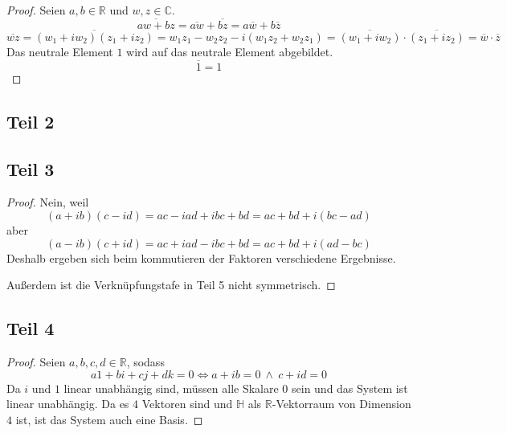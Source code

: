 \documentclass[10pt,a4paper]{article}
\begin{document}
\begin{proof}
Seien $a, b \in \mathbb{R}$ und $w, z \in \mathbb{C}$.
\begin{equation}
\overline{aw + bz} = \overline{aw} + \overline{bz} = a\overline{w} + b\overline{z}
\end{equation}
\begin{equation}
\overline{wz} = \overline{(w_{1} + iw_{2})(z_{1} + iz_{2})} = w_{1}z_{1} - w_{2}z_{2} - i(w_{1}z_{2} + w_{2}z_{1}) = \overline{(w_{1} + iw_{2})} \cdot \overline{(z_{1} + iz_{2})} = \overline{w} \cdot \overline{z}
\end{equation}
Das neutrale Element $1$ wird auf das neutrale Element abgebildet.
\begin{equation}
\overline{1} = 1
\end{equation}
\end{proof}

\subsection*{Teil 2}

\subsection*{Teil 3}

\begin{proof}
Nein, weil
\begin{equation}
(a + ib)(c - id) = ac - iad + ibc + bd = ac + bd + i(bc - ad)
\end{equation}
aber
\begin{equation}
(a - ib)(c + id) = ac + iad - ibc + bd = ac + bd + i(ad - bc)
\end{equation}
Deshalb ergeben sich beim kommutieren der Faktoren verschiedene Ergebnisse.

Außerdem ist die Verknüpfungstafe in Teil 5 nicht symmetrisch.
\end{proof}

\subsection*{Teil 4}

\begin{proof}
Seien $a, b, c, d \in \mathbb{R}$, sodass
\begin{equation}
a1 + bi + cj + dk = 0 \Leftrightarrow a + ib = 0\ \land\ c + id = 0
\end{equation}
Da $i$ und $1$ linear unabhängig sind, müssen alle Skalare $0$ sein und das System ist linear unabhängig.
Da es $4$ Vektoren sind und $\mathbb{H}$ als $\mathbb{R}$-Vektorraum von Dimension $4$ ist, ist das System auch eine Basis.
\end{proof}
\end{document}
